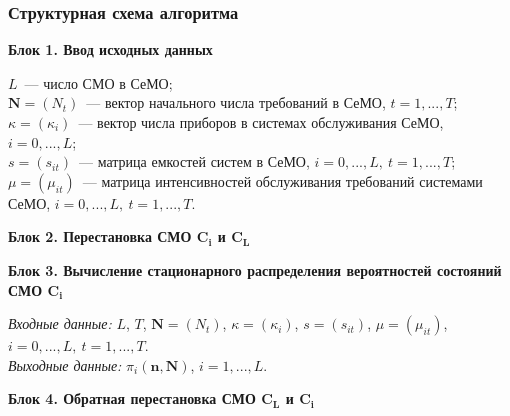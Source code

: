 \begin{frame} \frametitle{Структурная схема алгоритма}
\textbf{Блок 1. Ввод исходных данных}

$L$~--- число СМО в СеМО;\\
$\mathbf{N}=(N_t)$~--- вектор начального числа требований в СеМО, $t=1,...,T$;\\
$\kappa=(\kappa_i)$~--- вектор числа приборов в системах обслуживания СеМО, $i=0,...,L$;\\
$s=(s_{it})$~--- матрица емкостей систем в СеМО, $i=0,...,L,~t=1,...,T$;\\
$\mu=(\mu_{it})$~--- матрица интенсивностей обслуживания требований системами СеМО, $i=0,...,L,~t=1,...,T$.

\textbf{Блок 2. Перестановка СМО $\boldsymbol{C_i}$ и $\boldsymbol{C_L}$}

\textbf{Блок 3. Вычисление стационарного распределения вероятностей состояний СМО $\boldsymbol{C_i}$}

\emph{Входные данные:} $L$, $T$, $\mathbf{N}=(N_t)$, $\kappa=(\kappa_i)$, $s=(s_{it})$, $\mu=(\mu_{it})$, $i=0,...,L,~t=1,...,T$.\\
\emph{Выходные данные:} $\pi_i(\mathbf{n},\mathbf{N})$, $i=1,...,L$.

\textbf{Блок 4. Обратная перестановка СМО $\boldsymbol{C_L}$ и $\boldsymbol{C_i}$}
\end{frame}


